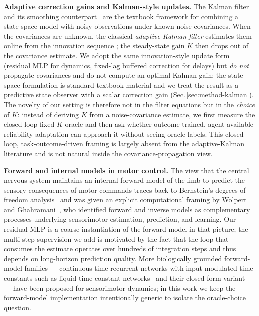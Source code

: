 \documentclass[sn-mathphys,NameDate,iicol]{sn-jnl}
\begin{document}
\noindent\textbf{Adaptive correction gains and Kalman-style updates.}
The Kalman filter \cite{kalman1960} and its smoothing
counterpart~\cite{rauch1965} are the textbook framework for combining
a state-space model with noisy observations under known noise
covariances. When the covariances are unknown, the classical
\emph{adaptive Kalman filter} estimates them online from the
innovation sequence \cite{mehra1970}; the steady-state gain $K$
then drops out of the covariance estimate. We adopt the same
innovation-style update form (residual MLP for dynamics, fixed-lag
buffered correction for delays) but \emph{do not} propagate
covariances and do not compute an optimal Kalman gain; the
state-space formulation is standard textbook material
\cite{anderson1979optimal} and we treat the result as a predictive
state observer with a scalar correction gain (Sec.\,\ref{sec:method-kalman}).
The novelty of our setting is therefore not in the filter equations
but in the \emph{choice} of $K$: instead of deriving $K$ from a
noise-covariance estimate, we first measure the closed-loop fixed-$K$
oracle and then ask whether outcome-trained, agent-available
reliability adaptation can approach it without seeing oracle labels.
This closed-loop, task-outcome-driven framing is largely absent from
the adaptive-Kalman literature and is not natural inside the
covariance-propagation view.

\smallskip

\noindent\textbf{Forward and internal models in motor control.}
The view that the central nervous system maintains an internal forward
model of the limb to predict the sensory consequences of motor
commands traces back to Bernstein's degrees-of-freedom
analysis~\cite{bernstein1967} and was given an explicit computational
framing by Wolpert and Ghahramani~\cite{wolpert2000}, who identified
forward and inverse models as complementary processes underlying
sensorimotor estimation, prediction, and learning. Our residual MLP is
a coarse instantiation of the forward model in that picture; the
multi-step supervision we add is motivated by the fact that the loop
that consumes the estimate operates over hundreds of integration steps
and thus depends on long-horizon prediction quality. More biologically
grounded forward-model families --- continuous-time recurrent networks
with input-modulated time constants such as liquid time-constant
networks~\cite{hasani2021liquid} and their closed-form
variant~\cite{hasani2022cfc} --- have been proposed for sensorimotor
dynamics; in this work we keep the forward-model implementation
intentionally generic to isolate the oracle-choice question.
\end{document}
